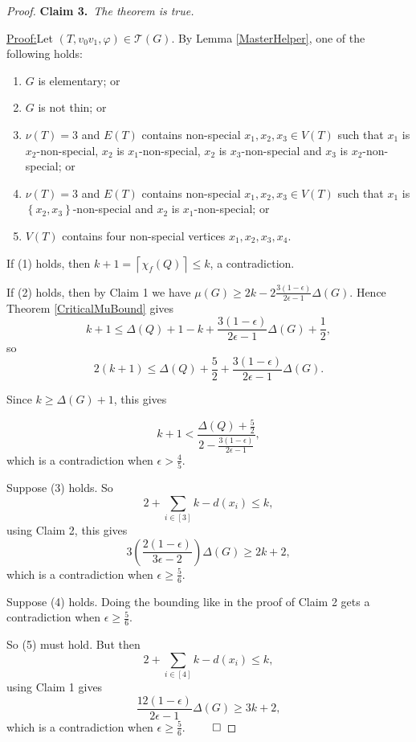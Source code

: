 \documentclass[12pt]{amsart}
\theoremstyle{plain}
\theoremstyle{definition}
\theoremstyle{remark}
\newcommand{\fancy}[1]{\mathcal{#1}}
\newcommand{\T}{\fancy{T}}
\newcommand{\set}[1]{\left\{ #1 \right\}}
\newcommand{\ceil}[1]{\left\lceil#1\right\rceil}
\newcommand{\irange}[1]{\left[#1\right]}
\newcommand{\parens}[1]{\left( #1 \right)}
\newcommand{\vph}{\varphi}
\newcommand{\claim}[2]{{\noindent\bf Claim #1.}~{\it #2}~~}
\newenvironment{claimproof}[1]{\par\noindent\underline{Proof:}\space#1}{\leavevmode\unskip\penalty9999
\hbox{}\nobreak\hfill\quad\hbox{$\qed$}}
\begin{document}
\begin{proof}
\bigskip

\claim{3}{The theorem is true.}

\begin{claimproof}
Let $(T, v_0v_1, \vph) \in \T(G)$. By Lemma \ref{MasterHelper}, one of the following holds:
\begin{enumerate}
\item $G$ is elementary; or
\item $G$ is not thin; or
\item $\nu(T) = 3$ and $E(T)$ contains non-special $x_1,x_2,x_3 \in V(T)$ such that $x_1$ is $x_2$-non-special, $x_2$ is $x_1$-non-special, $x_2$ is $x_3$-non-special and $x_3$ is $x_2$-non-special; or
\item $\nu(T) = 3$ and $E(T)$ contains non-special $x_1,x_2,x_3 \in V(T)$ such that $x_1$ is $\set{x_2,x_3}$-non-special and $x_2$ is $x_1$-non-special; or
\item $V(T)$ contains four non-special vertices $x_1, x_2, x_3, x_4$.
\end{enumerate}

If (1) holds, then $k + 1 = \ceil{\chi_f(Q)} \le k$, a contradiction.

If (2) holds, then by Claim 1 we have $\mu(G) \ge 2k - 2\frac{3(1-\epsilon)}{2\epsilon -1}\Delta(G)$.  Hence Theorem \ref{CriticalMuBound} gives
\[k + 1 \le \Delta(Q) + 1 - k + \frac{3(1-\epsilon)}{2\epsilon -1}\Delta(G) + \frac12,\]
so
\[2(k + 1) \le \Delta(Q) + \frac52 + \frac{3(1-\epsilon)}{2\epsilon -1}\Delta(G).\]

Since $k \ge \Delta(G) + 1$, this gives

\[k + 1 < \frac{\Delta(Q) + \frac52}{2 - \frac{3(1-\epsilon)}{2\epsilon -1}},\]
which is a contradiction when $\epsilon > \frac45$.

Suppose (3) holds.  So
\[2 + \sum_{i \in \irange{3}} k - d(x_i) \le k,\]
using Claim 2, this gives
\[3\parens{\frac{2(1-\epsilon)}{3\epsilon - 2}}\Delta(G) \ge 2k+2,\]
which is a contradiction when $\epsilon \ge \frac56$.

Suppose (4) holds.  Doing the bounding like in the proof of Claim 2 gets a contradiction when $\epsilon \ge \frac56$.


So (5) must hold.  But then
\[2 + \sum_{i \in \irange{4}} k - d(x_i) \le k,\]
using Claim 1 gives
\[\frac{12(1-\epsilon)}{2\epsilon -1}\Delta(G) \ge 3k+2,\]
which is a contradiction when $\epsilon \ge \frac{5}{6}$.
\end{claimproof}

\end{proof}
\end{document}
